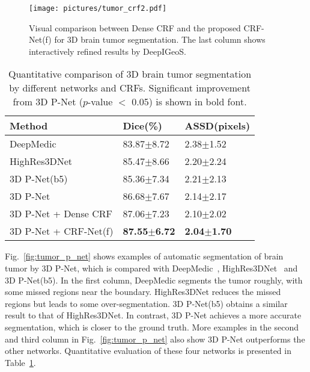 \documentclass[10pt,journal,compsoc]{IEEEtran}
\begin{document}
\begin{figure}[t]
	\centering
	\texttt{[image: pictures/tumor\_crf2.pdf]}
	\caption[Visual comparison between Dense CRF and the proposed CRF-Net(f) for 3D brain tumor segmentation]{ 
		Visual comparison between Dense CRF and the proposed CRF-Net(f) for 3D brain tumor segmentation. 
		The last column shows interactively refined results by DeepIGeoS.
	} 
	\label{fig:tumor_p_net_crf}
\end{figure}

\begin{table}
	\centering\label{key}
	\small
	\caption{Quantitative comparison of 3D brain tumor segmentation by different networks and CRFs. 
		Significant improvement from 3D P-Net ($p$-value $<$ 0.05) is shown in bold font.}
	\label{lab:tumor_p_net}
	\begin{tabular}{lll}
		
		\hline
		Method    & Dice(\%) & ASSD(pixels) \\ \hline
		DeepMedic~\cite{Kamnitsas2017}       & 83.87$\pm$8.72 & 2.38$\pm$1.52 \\ 
		HighRes3DNet~\cite{Li2017}   & 85.47$\pm$8.66 & 2.20$\pm$2.24 \\
		3D P-Net(b5) & 85.36$\pm$7.34 & 2.21$\pm$2.13 \\
		3D P-Net     & 86.68$\pm$7.67 & 2.14$\pm$2.17 \\  
		3D P-Net + Dense CRF & 87.06$\pm$7.23 & 2.10$\pm$2.02 \\ 
		3D P-Net + CRF-Net(f) & \textbf{87.55$\pm$6.72} & \textbf{2.04$\pm$1.70} \\ \hline
	\end{tabular}
	
\end{table}
Fig.~\ref{fig:tumor_p_net} shows examples of automatic segmentation of brain tumor by 3D P-Net, which is compared with DeepMedic~\cite{Kamnitsas2017}, HighRes3DNet~\cite{Li2017} and 3D P-Net(b5). In the first column, DeepMedic segments the tumor roughly, with some missed regions near the boundary. HighRes3DNet reduces the missed regions but leads to some over-segmentation. 3D P-Net(b5) obtains a similar result to that of HighRes3DNet. In contrast, 3D P-Net achieves a more accurate segmentation, which is closer to the ground truth. More examples in the second and third column in Fig.~\ref{fig:tumor_p_net} also show 3D P-Net outperforms the other networks. Quantitative evaluation of these four networks is presented in Table~\ref{lab:tumor_p_net}.
\end{document}
